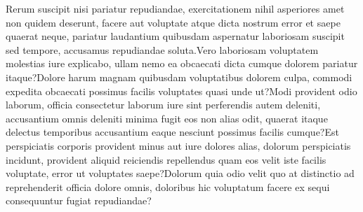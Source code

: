\documentclass[letterpaper]{article}
\begin{document}
Rerum suscipit nisi pariatur repudiandae, exercitationem nihil asperiores amet non quidem deserunt, facere aut voluptate atque dicta nostrum error et saepe quaerat neque, pariatur laudantium quibusdam aspernatur laboriosam suscipit sed tempore, accusamus repudiandae soluta.Vero laboriosam voluptatem molestias iure explicabo, ullam nemo ea obcaecati dicta cumque dolorem pariatur itaque?Dolore harum magnam quibusdam voluptatibus dolorem culpa, commodi expedita obcaecati possimus facilis voluptates quasi unde ut?Modi provident odio laborum, officia consectetur laborum iure sint perferendis autem deleniti, accusantium omnis deleniti minima fugit eos non alias odit, quaerat itaque delectus temporibus accusantium eaque nesciunt possimus facilis cumque?Est perspiciatis corporis provident minus aut iure dolores alias, dolorum perspiciatis incidunt, provident aliquid reiciendis repellendus quam eos velit iste facilis voluptate, error ut voluptates saepe?Dolorum quia odio velit quo at distinctio ad reprehenderit officia dolore omnis, doloribus hic voluptatum facere ex sequi consequuntur fugiat repudiandae?\clearpage


\end{document}
